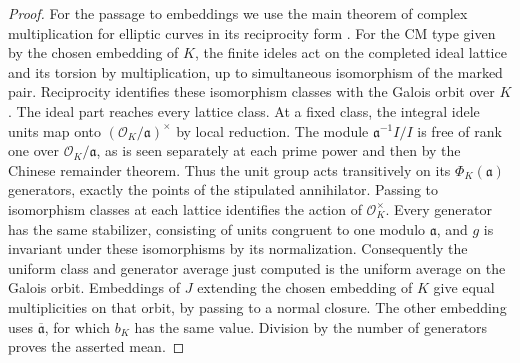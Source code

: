 \documentclass[a4paper,11pt]{article}
\theoremstyle{definition}
\theoremstyle{remark}
\numberwithin{equation}{section}
\begin{document}
\begin{proof}
For the passage to embeddings we use the main theorem of complex
multiplication for elliptic curves in its reciprocity form
\cite[Part II]{XIII-X-IV-cm37}. For the CM type given by the chosen
embedding of \(K\), the finite ideles act on the completed ideal
lattice and its torsion by multiplication, up to simultaneous
isomorphism of the marked pair. Reciprocity identifies these
isomorphism classes with the Galois orbit over \(K\).
The ideal part reaches every lattice class. At a fixed class,
the integral idele units map onto
\((\mathcal O_K/\mathfrak a)^\times\) by local reduction.
The module \(\mathfrak a^{-1}I/I\) is free of rank one over
\(\mathcal O_K/\mathfrak a\), as is seen separately at each
prime power and then by the Chinese remainder theorem.
Thus the unit group acts transitively on its
\(\Phi_K(\mathfrak a)\) generators, exactly the points of
the stipulated annihilator. Passing to isomorphism classes
at each lattice identifies the action of \(\mathcal O_K^\times\).
Every generator has the same stabilizer, consisting of units
congruent to one modulo \(\mathfrak a\), and \(g\) is invariant
under these isomorphisms by its normalization. Consequently the
uniform class and generator average just computed is the uniform
average on the Galois orbit. Embeddings of \(J\) extending the
chosen embedding of \(K\) give equal multiplicities on that
orbit, by passing to a normal closure. The other embedding uses
\(\overline{\mathfrak a}\), for which \(b_K\) has the same value.
Division by the number of generators proves the asserted mean.
\end{proof}
\end{document}
